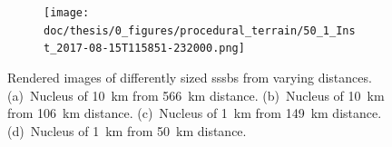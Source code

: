 \begin{figure}[htb]
\begin{subfigure}[b]{0.48\textwidth}
        \caption{}
        \label{fig:render_quali_comparison_3}
    \end{subfigure}
    \begin{subfigure}[b]{0.48\textwidth}
        \centering
        \texttt{[image: doc/thesis/0\_figures/procedural\_terrain/50\_1\_Inst\_2017-08-15T115851-232000.png]}
        \caption{}
        \label{fig:render_quali_comparison_4}
    \end{subfigure}
    \caption{Rendered images of differently sized \glspl{sssb} from varying distances. (a)~Nucleus of \SI{10}{\kilo\meter} from \SI{566}{\kilo\meter} distance. (b)~Nucleus of \SI{10}{\kilo\meter} from \SI{106}{\kilo\meter} distance. (c)~Nucleus of \SI{1}{\kilo\meter} from \SI{149}{\kilo\meter} distance. (d)~Nucleus of \SI{1}{\kilo\meter} from \SI{50}{\kilo\meter} distance.}
    \label{fig:render_quali_comparison}
\end{figure}

